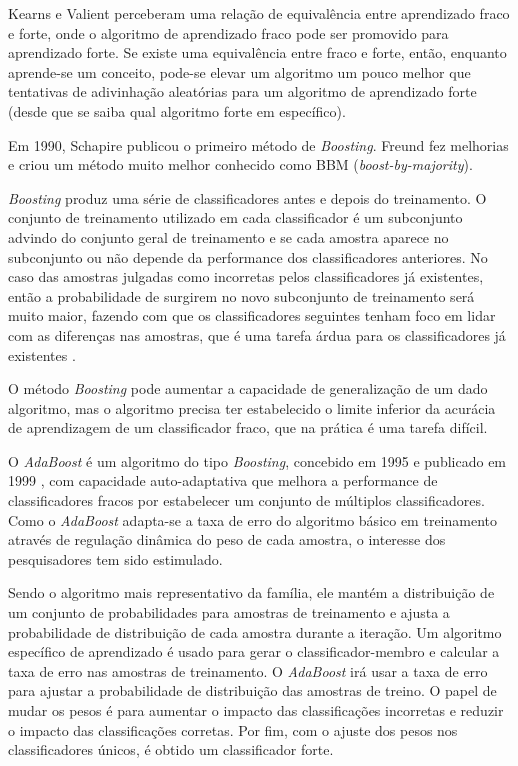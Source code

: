 Kearns e Valient perceberam uma relação de equivalência entre aprendizado fraco e forte, onde o algoritmo de aprendizado fraco pode ser promovido para aprendizado forte.
Se existe uma equivalência entre fraco e forte, então, enquanto aprende-se um conceito, pode-se elevar um algoritmo um pouco melhor que tentativas de adivinhação aleatórias para um algoritmo de aprendizado forte (desde que se saiba qual algoritmo forte em específico).

Em 1990, Schapire publicou o primeiro método de \textit{Boosting}. Freund fez melhorias e criou um método muito melhor conhecido como BBM (\textit{boost-by-majority}).

\textit{Boosting} produz uma série de classificadores antes e depois do treinamento. O conjunto de treinamento utilizado em cada classificador é um subconjunto advindo do conjunto geral de treinamento e se cada amostra aparece no subconjunto ou não depende da performance dos classificadores anteriores. No caso das amostras julgadas como incorretas pelos classificadores já existentes, então a probabilidade de surgirem no novo subconjunto de treinamento será muito maior, fazendo com que os classificadores seguintes tenham foco em lidar com as diferenças nas amostras, que é uma tarefa árdua para os classificadores já existentes \cite{wu2011some}.

O método \textit{Boosting} pode aumentar a capacidade de generalização de um dado algoritmo, mas o algoritmo precisa ter estabelecido o limite inferior da acurácia de aprendizagem de um classificador fraco, que na prática é uma tarefa difícil.

O \textit{AdaBoost} é um algoritmo do tipo \textit{Boosting}, concebido em 1995 e publicado em 1999 \cite{adaboostfreund1999short}, com capacidade auto-adaptativa que melhora a performance de classificadores fracos por estabelecer um conjunto de múltiplos classificadores. Como o \textit{AdaBoost} adapta-se a taxa de erro do algoritmo básico em treinamento através de regulação dinâmica do peso de cada amostra, o interesse dos pesquisadores tem sido estimulado.

Sendo o algoritmo mais representativo da família, ele mantém a distribuição de um conjunto de probabilidades para amostras de treinamento e ajusta a probabilidade de distribuição de cada amostra durante a iteração. Um algoritmo específico de aprendizado é usado para gerar o classificador-membro e calcular a taxa de erro nas amostras de treinamento. O \textit{AdaBoost} irá usar a taxa de erro para ajustar a probabilidade de distribuição das amostras de treino. O papel de mudar os pesos é para aumentar o impacto das classificações incorretas e reduzir o impacto das classificações corretas. Por fim, com o ajuste dos pesos nos classificadores únicos, é obtido um classificador forte.

